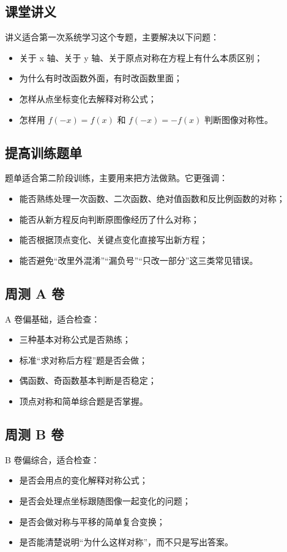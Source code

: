 \documentclass[11pt,a4paper,fontset=fandol]{ctexart}
\begin{document}
\subsection{课堂讲义}
讲义适合第一次系统学习这个专题，主要解决以下问题：
\begin{itemize}
  \item 关于 x 轴、关于 y 轴、关于原点对称在方程上有什么本质区别；
  \item 为什么有时改函数外面，有时改函数里面；
  \item 怎样从点坐标变化去解释对称公式；
  \item 怎样用 $f(-x)=f(x)$ 和 $f(-x)=-f(x)$ 判断图像对称性。
\end{itemize}

\subsection{提高训练题单}
题单适合第二阶段训练，主要用来把方法做熟。它更强调：
\begin{itemize}
  \item 能否熟练处理一次函数、二次函数、绝对值函数和反比例函数的对称；
  \item 能否从新方程反向判断原图像经历了什么对称；
  \item 能否根据顶点变化、关键点变化直接写出新方程；
  \item 能否避免“改里外混淆”“漏负号”“只改一部分”这三类常见错误。
\end{itemize}

\subsection{周测 A 卷}
A 卷偏基础，适合检查：
\begin{itemize}
  \item 三种基本对称公式是否熟练；
  \item 标准“求对称后方程”题是否会做；
  \item 偶函数、奇函数基本判断是否稳定；
  \item 顶点对称和简单综合题是否掌握。
\end{itemize}

\subsection{周测 B 卷}
B 卷偏综合，适合检查：
\begin{itemize}
  \item 是否会用点的变化解释对称公式；
  \item 是否会处理点坐标跟随图像一起变化的问题；
  \item 是否会做对称与平移的简单复合变换；
  \item 是否能清楚说明“为什么这样对称”，而不只是写出答案。
\end{itemize}
\end{document}
